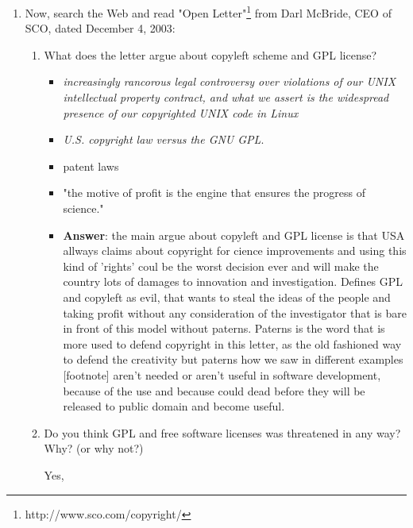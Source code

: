 \documentclass[11pt]{scrartcl}
\begin{document}
\begin{enumerate}
	\item Now, search the Web and read "Open Letter"\footnote{http://www.sco.com/copyright/} from Darl McBride, CEO of SCO, dated December 4, 2003:	

	\begin{enumerate}
		\item What does the letter argue about copyleft scheme and GPL license?
			\begin{itemize}
				\item \emph{increasingly rancorous legal controversy over violations of our UNIX intellectual property contract, and what we assert is the widespread presence of our copyrighted UNIX code in Linux}
				\item \emph{U.S. copyright law versus the GNU GPL}.
				\item patent laws
				\item "the motive of profit is the engine that ensures the progress of science."
				
				\item \textbf{Answer}: the main argue about copyleft and GPL license is that USA allways claims about copyright for cience improvements and using this kind of 'rights' coul be the worst decision ever and will make the country lots of damages to innovation and investigation. Defines GPL and copyleft as evil, that wants to steal the ideas of the people and taking profit without any consideration of the investigator that is bare in front of this model without paterns. Paterns is the word that is more used to defend copyright in this letter, as the old fashioned way to defend the creativity but paterns how we saw in different examples [footnote] aren't needed or aren't useful in software development, because of the use and because could dead before they will be released to public domain and become useful.
				
			\end{itemize}
		\item Do you think GPL and free software licenses was threatened in any way? Why? (or why not?)
		
		Yes, 
	\end{enumerate}

\end{enumerate}
\end{document}
